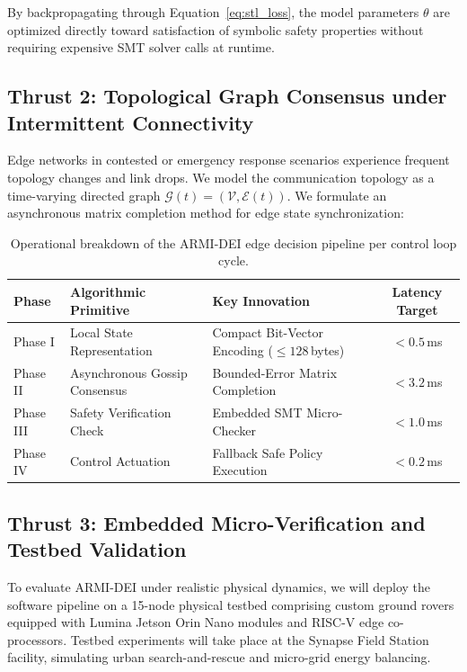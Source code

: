 \documentclass[11pt,letterpaper]{scrartcl}
\begin{document}
By backpropagating through Equation~\ref{eq:stl_loss}, the model parameters $\theta$ are optimized directly toward satisfaction of symbolic safety properties without requiring expensive SMT solver calls at runtime.

\subsection{Thrust 2: Topological Graph Consensus under Intermittent Connectivity}
Edge networks in contested or emergency response scenarios experience frequent topology changes and link drops. We model the communication topology as a time-varying directed graph $\mathcal{G}(t) = (\mathcal{V}, \mathcal{E}(t))$. We formulate an asynchronous matrix completion method for edge state synchronization:

\begin{table}[h!]
\centering
\small
\begin{tabularx}{\textwidth}{@{}l p{4.2cm} X c@{}}
\toprule
\textbf{Phase} & \textbf{Algorithmic Primitive} & \textbf{Key Innovation} & \textbf{Latency Target} \\
\midrule
Phase I & Local State Representation & Compact Bit-Vector Encoding ($\le 128$\,bytes) & $< 0.5$\,ms \\
Phase II & Asynchronous Gossip Consensus & Bounded-Error Matrix Completion & $< 3.2$\,ms \\
Phase III & Safety Verification Check & Embedded SMT Micro-Checker & $< 1.0$\,ms \\
Phase IV & Control Actuation & Fallback Safe Policy Execution & $< 0.2$\,ms \\
\bottomrule
\end{tabularx}
\caption{Operational breakdown of the ARMI-DEI edge decision pipeline per control loop cycle.}
\label{tab:pipeline}
\end{table}

\subsection{Thrust 3: Embedded Micro-Verification and Testbed Validation}
To evaluate ARMI-DEI under realistic physical dynamics, we will deploy the software pipeline on a 15-node physical testbed comprising custom ground rovers equipped with Lumina Jetson Orin Nano modules and RISC-V edge co-processors. Testbed experiments will take place at the Synapse Field Station facility, simulating urban search-and-rescue and micro-grid energy balancing.
\end{document}
